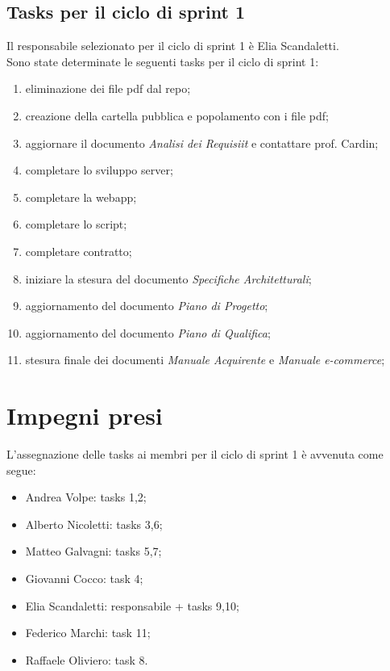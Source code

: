 \documentclass[a4paper, 12pt]{article}
\begin{document}
\subsection{Tasks per il ciclo di sprint 1}
Il responsabile selezionato per il ciclo di sprint 1 è Elia Scandaletti. \\
Sono state determinate le seguenti tasks per il ciclo di sprint 1:
\begin{enumerate}
	\item eliminazione dei file pdf dal repo;
	\item creazione della cartella pubblica e popolamento con i file pdf;
	\item aggiornare il documento \textit{Analisi dei Requisiit} e contattare prof. Cardin;
	\item completare lo sviluppo server;
	\item completare la webapp;
	\item completare lo script;
	\item completare contratto;
	\item iniziare la stesura del documento \textit{Specifiche Architetturali};
	\item aggiornamento del documento \textit{Piano di Progetto};
	\item aggiornamento del documento \textit{Piano di Qualifica};
	\item stesura finale dei documenti \textit{Manuale Acquirente} e \textit{Manuale e-commerce}; \\

\end{enumerate}

\section{Impegni presi}
L'assegnazione delle tasks ai membri per il ciclo di sprint 1 è avvenuta come segue:
\begin{itemize}
	\item Andrea Volpe: tasks 1,2;
	\item Alberto Nicoletti: tasks 3,6;
	\item Matteo Galvagni: tasks 5,7;
	\item Giovanni Cocco: task 4;
	\item Elia Scandaletti: responsabile + tasks 9,10;
	\item Federico Marchi: task 11;
	\item Raffaele Oliviero: task 8.
\end{itemize}
\end{document}
